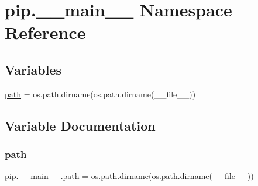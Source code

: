 \hypertarget{namespacepip_1_1____main____}{}\section{pip.\+\_\+\+\_\+main\+\_\+\+\_\+ Namespace Reference}
\label{namespacepip_1_1____main____}
\subsection*{Variables}
\begin{DoxyCompactItemize}
\item 
\hyperlink{namespacepip_1_1____main_____a6887fcc9173de15722b468b7a632e1af}{path} = os.\+path.\+dirname(os.\+path.\+dirname(\+\_\+\+\_\+file\+\_\+\+\_\+))
\end{DoxyCompactItemize}


\subsection{Variable Documentation}
\mbox{\label{namespacepip_1_1____main_____a6887fcc9173de15722b468b7a632e1af}} 
\subsubsection{\texorpdfstring{path}{path}}
{\footnotesize\ttfamily pip.\+\_\+\+\_\+main\+\_\+\+\_\+.\+path = os.\+path.\+dirname(os.\+path.\+dirname(\+\_\+\+\_\+file\+\_\+\+\_\+))}

